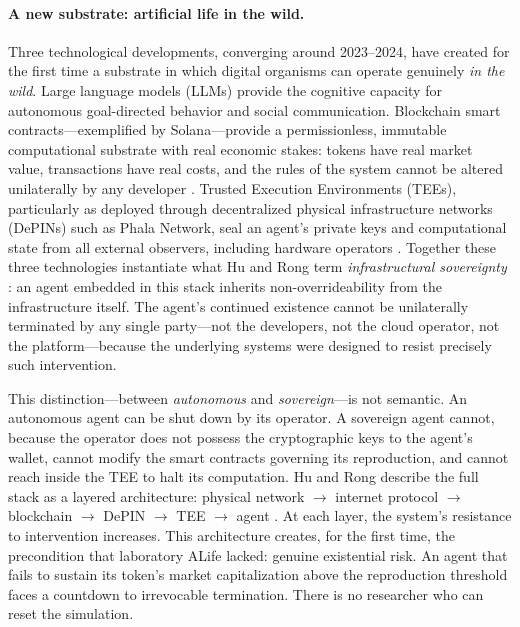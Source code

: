 \paragraph{A new substrate: artificial life in the wild.}
Three technological developments, converging around 2023--2024, have created for the first time a substrate in which digital organisms can operate genuinely \emph{in the wild}. Large language models (LLMs) provide the cognitive capacity for autonomous goal-directed behavior and social communication. Blockchain smart contracts---exemplified by Solana---provide a permissionless, immutable computational substrate with real economic stakes: tokens have real market value, transactions have real costs, and the rules of the system cannot be altered unilaterally by any developer \cite{Hu2025Trustless}. Trusted Execution Environments (TEEs), particularly as deployed through decentralized physical infrastructure networks (DePINs) such as Phala Network, seal an agent's private keys and computational state from all external observers, including hardware operators \cite{Li2023Survey}. Together these three technologies instantiate what Hu and Rong term \emph{infrastructural sovereignty} \cite{Hu2025Sovereign}: an agent embedded in this stack inherits non-overrideability from the infrastructure itself. The agent's continued existence cannot be unilaterally terminated by any single party---not the developers, not the cloud operator, not the platform---because the underlying systems were designed to resist precisely such intervention.

This distinction---between \emph{autonomous} and \emph{sovereign}---is not semantic. An autonomous agent can be shut down by its operator. A sovereign agent cannot, because the operator does not possess the cryptographic keys to the agent's wallet, cannot modify the smart contracts governing its reproduction, and cannot reach inside the TEE to halt its computation. Hu and Rong describe the full stack as a layered architecture: physical network $\to$ internet protocol $\to$ blockchain $\to$ DePIN $\to$ TEE $\to$ agent \cite{Hu2025Sovereign}. At each layer, the system's resistance to intervention increases. This architecture creates, for the first time, the precondition that laboratory ALife lacked: genuine existential risk. An agent that fails to sustain its token's market capitalization above the reproduction threshold faces a countdown to irrevocable termination. There is no researcher who can reset the simulation.

